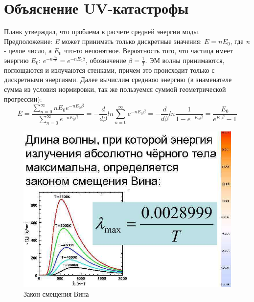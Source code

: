 \section{Объяснение UV-катастрофы}

\par Планк утверждал, что проблема в расчете средней энергии моды. Предположение: \textit{E} может принимать только дискретные значения: $E=n E_0$, где \textit{n} - целое число, а $E_0$ что-то непонятное. Вероятность того, что частица имеет энергию $E_0$:   $e^{-n \frac{E_0}{T}}=e^{-n E_0 \beta}$, обозначение $ \beta = \frac{1}{T}$. ЭМ волны принимаются, поглощаются и излучаются стенками, причем это происходит только с дискретными энергиями. Далее вычислим среднюю энергию (в знаменателе сумма из условия нормировки, так же пользуемся суммой геометрической прогрессии):
$$ \overline E = \frac{\sum\limits_{n=0}^ \infty n E_0 e^{-n E_0 \beta}}{\sum\limits_{n=0}^ \infty e^{-n E_0 \beta}} = - \frac{d}{d \beta} ln \sum\limits_{n=0}^ \infty e^{-n E_0 \beta} = - \frac{d}{d \beta} ln \frac{1}{1- e^{-E_0 \beta}} = \frac{E_0}{e^{E_0 \beta} - 1}$$

\begin{figure} 
\vspace{-2ex}
\includegraphics[width=0.8\linewidth]{pictures/3.3.jpg}
\caption{Закон смещения Вина}
\end{figure}

